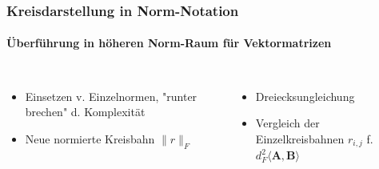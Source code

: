 \documentclass{beamer}
\begin{document}
\begin{frame}
\frametitle{Kreisdarstellung in Norm-Notation}
\framesubtitle{Überführung in höheren Norm-Raum für Vektormatrizen}

\begin{columns}[c]
	\begin{itemize}
		\item <2-> Einsetzen v. Einzelnormen, "runter brechen" d. Komplexität
		\item <3-> Neue normierte Kreisbahn $\|r\|_F$
	\end{itemize}

	\begin{itemize}
		\item <4-> Dreiecksungleichung
		\item <5-> Vergleich der Einzelkreisbahnen $r_{i,j}$ f. $d_F^2\langle\mathbf{A},\mathbf{B}\rangle$
	\end{itemize}
\end{columns}


\end{frame}
\end{document}
